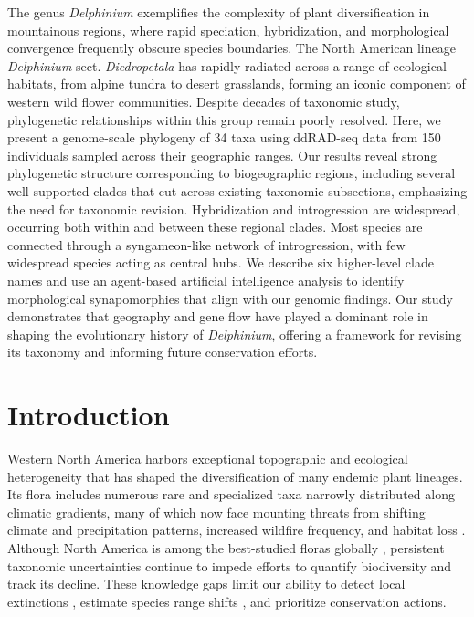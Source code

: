\documentclass[11pt]{article}
\begin{document}
The genus \emph{Delphinium} exemplifies the complexity of plant diversification in mountainous regions, where rapid speciation, hybridization, and morphological convergence frequently obscure species boundaries. The North American lineage \emph{Delphinium} sect. \emph{Diedropetala} has rapidly radiated across a range of ecological habitats, from alpine tundra to desert grasslands, forming an iconic component of western wild flower communities. Despite decades of taxonomic study, phylogenetic relationships within this group remain poorly resolved. Here, we present a genome-scale phylogeny of 34 taxa using ddRAD-seq data from 150 individuals sampled across their geographic ranges. Our results reveal strong phylogenetic structure corresponding to biogeographic regions, including several well-supported clades that cut across existing taxonomic subsections, emphasizing the need for taxonomic revision. Hybridization and introgression are widespread, occurring both within and between these regional clades. Most species are connected through a syngameon-like network of introgression, with few widespread species acting as central hubs. We describe six higher-level clade names and use an agent-based artificial intelligence analysis to identify morphological synapomorphies that align with our genomic findings. Our study demonstrates that geography and gene flow have played a dominant role in shaping the evolutionary history of \emph{Delphinium}, offering a framework for revising its taxonomy and informing future conservation efforts.


\section*{Introduction}
Western North America harbors exceptional topographic and ecological heterogeneity
that has shaped the diversification of many endemic plant lineages.
Its flora includes numerous rare and specialized taxa narrowly distributed
along climatic gradients, many of which now face mounting threats from shifting
climate and precipitation patterns, increased wildfire frequency, and habitat loss
\citep{kannenberg_rapid_2021,overpeck_climate_2020}.
% 
Although North America is among the best-studied floras globally
 \citep{hickman1993jepson,FNA_Vol3_1997,cronquist_intermountain_1984}, 
persistent taxonomic uncertainties continue to
impede efforts to quantify biodiversity and track its decline. 
% 
These knowledge gaps limit our ability to detect 
local extinctions \citep{wiens_climate-related_2016},
estimate species range shifts \citep{frei_plant_2010}, 
and prioritize conservation actions.
\end{document}
